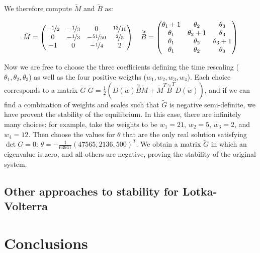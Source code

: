 \documentclass{article}
\begin{document}
We therefore compute \(\tilde{M}\) and \(\tilde{B}\) as:

\begin{equation}
\tilde{M} = \begin{pmatrix}
-\nicefrac{1}{2} & -\nicefrac{1}{3} & 0 & \nicefrac{13}{10}\\
0 &  -\nicefrac{1}{3} &  -\nicefrac{51}{50} & \nicefrac{2}{5}\\
-1 & 0 & -\nicefrac{1}{4} & 2
\end{pmatrix} 
\quad
\overset{\approx}{B} = \begin{pmatrix}
\theta_1 + 1 & \theta_2 & \theta_3 \\
\theta_1 & \theta_2 +1 & \theta_3 \\
\theta_1  & \theta_2 & \theta_3 +1 \\
\theta_1 & \theta_2 & \theta_3
\end{pmatrix}
\end{equation}

Now we are free to choose the three coefficients defining the time
rescaling (\(\theta_1, \theta_2, \theta_3\)) as well as the four
positive weigths (\(w_1, w_2, w_3, w_4\)). Each choice corresponds to a
matrix \(\tilde{G}\)
\(\tilde{G} = \frac{1}{2} (D(\tilde{w}) \overset{\approx}{B}\tilde{M} + \tilde{M}^T\overset{\approx}{B}^T D(\tilde{w}))\),
and if we can find a combination of weights and scales such that
\(\tilde{G}\) is negative semi-definite, we have provent the stability
of the equilibrium. In this case, there are infinitely many choices: for
example, take the weights to be \(w_1 = 21\), \(w_2 = 5\), \(w_3 = 2\),
and \(w_4 = 12\). Then choose the values for \(\theta\) that are the
only real solution satisfying \(\det G = 0\):
\(\theta = -\frac{1}{63941}(47565, 2136, 500)^T\). We obtain a matrix
\(\tilde{G}\) in which an eigenvalue is zero, and all others are
negative, proving the stability of the original system.

\hypertarget{other-approaches-to-stability-for-lotka-volterra}{%
\subsection{Other approaches to stability for
Lotka-Volterra}\label{other-approaches-to-stability-for-lotka-volterra}}

\hypertarget{conclusions}{%
\section*{Conclusions}\label{conclusions}}
\end{document}
